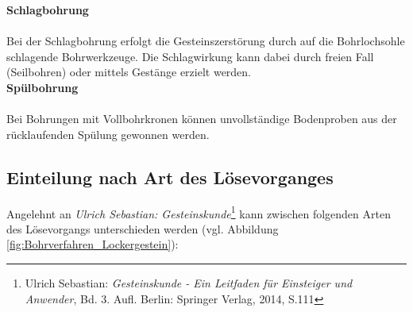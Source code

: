 \documentclass[12pt,a4paper,draft]{scrartcl} %
\begin{document}
\textbf{Schlagbohrung}\\\\
Bei der Schlagbohrung erfolgt die Gesteinszerstörung durch auf die Bohrlochsohle schlagende Bohrwerkzeuge. Die Schlagwirkung kann dabei durch freien Fall (Seilbohren) oder mittels Gestänge erzielt werden.\\

\textbf{Spülbohrung}\\\\
Bei Bohrungen mit Vollbohrkronen können unvollständige Bodenproben aus der rücklaufenden Spülung gewonnen werden.\\

\subsection{Einteilung nach Art des Lösevorganges}

Angelehnt an \emph{Ulrich Sebastian: Gesteinskunde}\footnote{Ulrich Sebastian: \emph{Gesteinskunde - Ein Leitfaden für Einsteiger und Anwender}, Bd. 3. Aufl. Berlin: Springer Verlag, 2014, S.111} kann zwischen folgenden Arten des Lösevorgangs unterschieden werden (vgl. Abbildung \ref{fig:Bohrverfahren_Lockergestein}):
\end{document}
